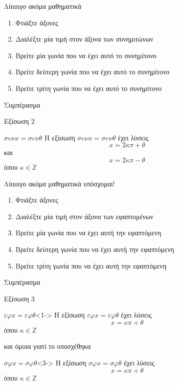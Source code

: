 \documentclass{presentation}
\begin{document}
\begin{frame}{Λίιιιιιγο ακόμα μαθηματικά}
  \begin{enumerate}
    \item<1-> Φτιάξτε άξονες
    \item<2-> Διαλέξτε μία τιμή στον άξονα των συνημιτώνων
    \item<3-> Βρείτε μία γωνία που να έχει αυτό το συνημίτονο
    \item<4-> Βρείτε δεύτερη γωνία που να έχει αυτό το συνημίτονο
    \item<5-> Βρείτε τρίτη γωνία που να έχει αυτό το συνημίτονο
  \end{enumerate}
   Συμπέρασμα
\end{frame}

\begin{frame}{Εξίσωση 2}
  \begin{block}{$συνx=συνθ$}
    Η εξίσωση $συνx=συνθ$ έχει λύσεις
    $$x=2κπ+θ$$
    και
    $$x=2κπ-θ$$
    όπου $κ\in\mathbb{Z}$
  \end{block}
\end{frame}

\begin{frame}{Λίιιιιιγο ακόμα μαθηματικά υπόσχομαι!}
  \begin{enumerate}
    \item<1-> Φτιάξτε άξονες
    \item<2-> Διαλέξτε μία τιμή στον άξονα των εφαπτομένων
    \item<3-> Βρείτε μία γωνία που να έχει αυτή την εφαπτόμενη
    \item<4-> Βρείτε δεύτερη γωνία που να έχει αυτή την εφαπτόμενη
    \item<5-> Βρείτε τρίτη γωνία που να έχει αυτή την εφαπτόμενη
  \end{enumerate}
   Συμπέρασμα
\end{frame}

\begin{frame}{Εξίσωση 3}
  \begin{block}{$εφx=εφθ$}<1->
    Η εξίσωση $εφx=εφθ$ έχει λύσεις
    $$x=κπ+θ$$
    όπου $κ\in\mathbb{Z}$
  \end{block}
   και όμοια γιατί το υποσχέθηκα

  \begin{block}{$σφx=σφθ$}<3->
    Η εξίσωση $σφx=σφθ$ έχει λύσεις
    $$x=κπ+θ$$
    όπου $κ\in\mathbb{Z}$
  \end{block}
\end{frame}
\end{document}
